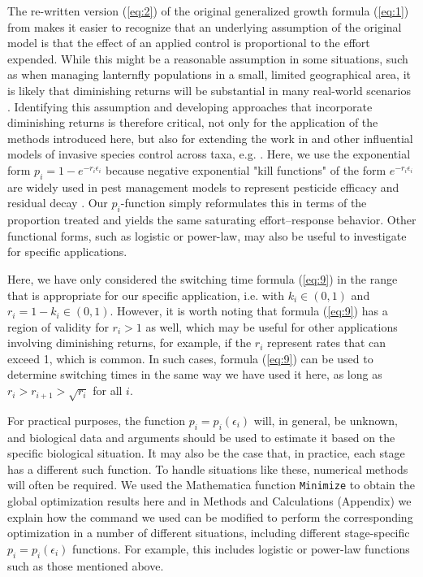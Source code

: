 \documentclass[onecolumn]{article}
\begin{document}
The re-written version (\ref{eq:2}) of the original generalized growth formula (\ref{eq:1}) from \citep{Strombom2021} makes it easier to recognize that an underlying assumption of the original model is that the effect of an applied control is proportional to the effort expended. While this might be a reasonable assumption in some situations, such as when managing lanternfly populations in a small, limited geographical area, it is likely that diminishing returns will be substantial in many real-world scenarios \citep{Oerke2006,Mitchell2014,Brown2017,Edholm2018}. Identifying this assumption and developing approaches that incorporate diminishing returns is therefore critical, not only for the application of the methods introduced here, but also for extending the work in \citep{Strombom2021} and other influential models of invasive species control across taxa, e.g. \citep{Hastings2006,Blackwood2010,Moody1988,Buyuktahtakin2018,Thompson2021}. Here, we use the exponential form $p_i = 1 - e^{-r_i \epsilon_i}$ because negative exponential "kill functions" of the form $e^{-r_i \epsilon_i}$ are widely used in pest management models to represent pesticide efficacy and residual decay \citep{Bor1995,Liang2012, Liu2021}. Our $p_i$-function simply reformulates this in terms of the proportion treated and yields the same saturating effort–response behavior. Other functional forms, such as logistic or power-law, may also be useful to investigate for specific applications.

Here, we have only considered the switching time formula (\ref{eq:9}) in the range that is appropriate for our specific application, i.e. with $k_i \in (0,1)$ and $r_i = 1 - k_i \in (0,1)$. However, it is worth noting that formula (\ref{eq:9}) has a region of validity for $r_i > 1$ as well, which may be useful for other applications involving diminishing returns, for example, if the $r_i$ represent rates that can exceed 1, which is common. In such cases, formula (\ref{eq:9}) can be used to determine switching times in the same way we have used it here, as long as $r_i > r_{i+1} > \sqrt{r_i}$ for all $i$.

For practical purposes, the function $p_i = p_i(\epsilon_i)$ will, in general, be unknown, and biological data and arguments should be used to estimate it based on the specific biological situation. It may also be the case that, in practice, each stage has a different such function. To handle situations like these, numerical methods will often be required. We used the Mathematica function {\tt Minimize} \citep{Mathematica} to obtain the global optimization results here and in Methods and Calculations (Appendix) we explain how the command we used can be modified to perform the corresponding optimization in a number of different situations, including different stage-specific $p_i = p_i(\epsilon_i)$ functions. For example, this includes logistic or power-law functions such as those mentioned above.
\end{document}
